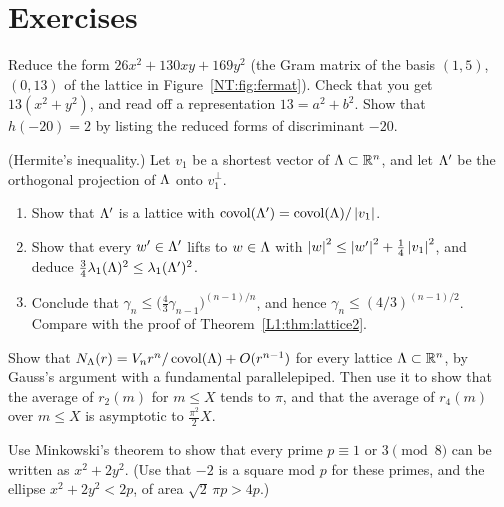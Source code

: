 \section*{Exercises}

\begin{exercise}\label{NT:ex:reduce}
Reduce the form $26x^2+130xy+169y^2$ (the Gram matrix of the basis $(1,5)$, $(0,13)$ of the lattice in
Figure~\ref{NT:fig:fermat}). Check that you get $13(x^2+y^2)$, and read off a representation $13=a^2+b^2$.
Show that $h(-20)=2$ by listing the reduced forms of discriminant $-20$.
\end{exercise}

\begin{exercise}\label{NT:ex:hermite}
(Hermite's inequality.) Let $v_1$ be a shortest vector of $\Lambda\subset\mathbb{R}^n$, and let $\Lambda'$ be the
orthogonal projection of $\Lambda$ onto $v_1^\perp$.
\begin{enumerate}[nosep]
\item Show that $\Lambda'$ is a lattice with $\operatorname{covol}(\Lambda')=\operatorname{covol}(\Lambda)/\left\lvert v_1 \right\rvert$.
\item Show that every $w'\in\Lambda'$ lifts to $w\in\Lambda$ with $\left\lvert w \right\rvert^2\le\left\lvert w' \right\rvert^2+\frac14\left\lvert v_1 \right\rvert^2$, and
  deduce $\frac34\lambda_1(\Lambda)^2\le\lambda_1(\Lambda')^2$.
\item Conclude that $\gamma_n\le\big(\frac43\gamma_{n-1}\big)^{(n-1)/n}$, and hence $\gamma_n\le(4/3)^{(n-1)/2}$.
  Compare with the proof of Theorem~\ref{L1:thm:lattice2}.
\end{enumerate}
\end{exercise}

\begin{exercise}
Show that $N_\Lambda(r)=V_nr^n/\operatorname{covol}(\Lambda)+O(r^{n-1})$ for every lattice $\Lambda\subset\mathbb{R}^n$, by Gauss's
argument with a fundamental parallelepiped. Then use it to show that the average of $r_2(m)$ for
$m\le X$ tends to $\pi$, and that the average of $r_4(m)$ over $m\le X$ is asymptotic to $\frac{\pi^2}{2}X$.
\end{exercise}

\begin{exercise}
Use Minkowski's theorem to show that every prime $p\equiv1$ or $3\pmod8$ can be written as $x^2+2y^2$.
(Use that $-2$ is a square mod $p$ for these primes, and the ellipse $x^2+2y^2<2p$, of area $\sqrt2\,\pi p>4p$.)
\end{exercise}


